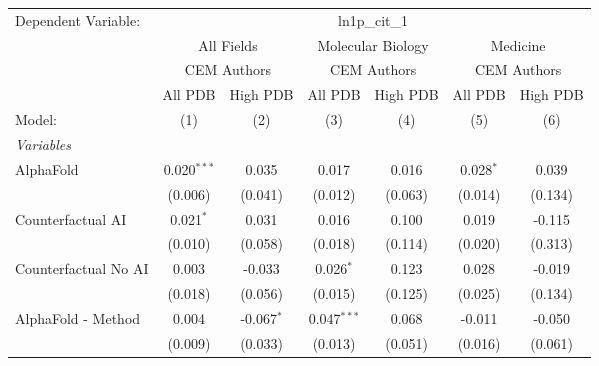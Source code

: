 \begingroup
\centering
\begin{tabular}{lcccccc}
   \tabularnewline \midrule \midrule
   Dependent Variable: & \multicolumn{6}{c}{ln1p\_cit\_1}\\
 & \multicolumn{2}{c}{All Fields} & \multicolumn{2}{c}{Molecular Biology} & \multicolumn{2}{c}{Medicine} \\
\cmidrule(lr){2-3} \cmidrule(lr){4-5} \cmidrule(lr){6-7}
 & \multicolumn{2}{c}{CEM Authors} & \multicolumn{2}{c}{CEM Authors} & \multicolumn{2}{c}{CEM Authors} \\
\cmidrule(lr){2-3} \cmidrule(lr){4-5} \cmidrule(lr){6-7}
 & \multicolumn{1}{c}{All PDB} & \multicolumn{1}{c}{High PDB} & \multicolumn{1}{c}{All PDB} & \multicolumn{1}{c}{High PDB} & \multicolumn{1}{c}{All PDB} & \multicolumn{1}{c}{High PDB} \\
\cmidrule(lr){2-2} \cmidrule(lr){3-3} \cmidrule(lr){4-4} \cmidrule(lr){5-5} \cmidrule(lr){6-6} \cmidrule(lr){7-7}
   Model:                                                     & (1)            & (2)           & (3)           & (4)     & (5)            & (6)\\  
   \midrule
   \emph{Variables}\\
   AlphaFold                                                  & 0.020$^{***}$  & 0.035         & 0.017         & 0.016   & 0.028$^{*}$    & 0.039\\   
                                                              & (0.006)        & (0.041)       & (0.012)       & (0.063) & (0.014)        & (0.134)\\   
   Counterfactual AI                                          & 0.021$^{*}$    & 0.031         & 0.016         & 0.100   & 0.019          & -0.115\\   
                                                              & (0.010)        & (0.058)       & (0.018)       & (0.114) & (0.020)        & (0.313)\\   
   Counterfactual No AI                                       & 0.003          & -0.033        & 0.026$^{*}$   & 0.123   & 0.028          & -0.019\\   
                                                              & (0.018)        & (0.056)       & (0.015)       & (0.125) & (0.025)        & (0.134)\\   
   AlphaFold - Method                                         & 0.004          & -0.067$^{*}$  & 0.047$^{***}$ & 0.068   & -0.011         & -0.050\\   
                                                              & (0.009)        & (0.033)       & (0.013)       & (0.051) & (0.016)        & (0.061)\\   

\end{tabular}
